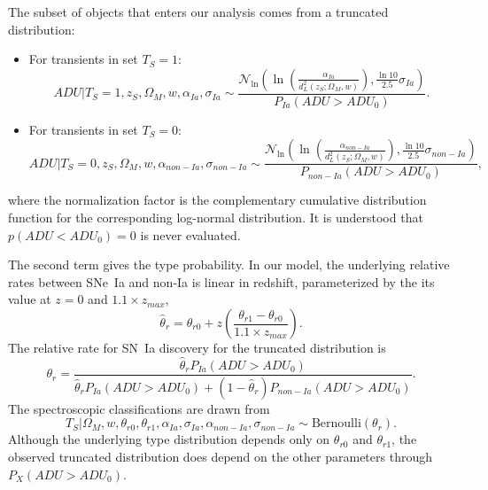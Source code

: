 \documentclass[preprint]{elsarticle}
\begin{document}
The subset of objects that enters our analysis comes from a truncated distribution:
\begin{itemize}
\item For transients in set $T_S=1$:
\begin{equation}
\mathit{ADU} | T_S=1, z_S, \Omega_M, w, \alpha_{Ia},\sigma_{Ia} \sim
\frac{\mathcal{N}_{\ln}\left(\ln{\left(\frac{\alpha_{Ia}}{d_L^2(z_S;\Omega_M, w)}\right)}, \frac{\ln{10}}{2.5}\sigma_{Ia}\right)}{P_{Ia}(\mathit{ADU} > \mathit{ADU}_0)}.
\label{adusnIa:eqn}
\end{equation}
\item For transients in set $T_S=0$:
\begin{equation}
\mathit{ADU} | T_S=0, z_S, \Omega_M, w, \alpha_{\mathit{non-Ia}},\sigma_{\mathit{non-Ia}}\sim 
\frac{\mathcal{N}_{\ln}\left(\ln{\left(\frac{\alpha_{\mathit{non-Ia}}}{d_L^2(z_S;\Omega_M, w)}\right)}, \frac{\ln{10}}{2.5}\sigma_{\mathit{non-Ia}}\right)}{P_{non-Ia}(\mathit{ADU} > \mathit{ADU}_0)},
\label{adunonIa:eqn}
\end{equation}
\end{itemize}
where the normalization factor is the complementary cumulative distribution function
for the corresponding log-normal distribution.
It is understood that $p(\mathit{ADU}<\mathit{ADU}_0)=0$ is never evaluated.

The second term gives the type probability. In our model,
the underlying relative rates between SNe~Ia and non-Ia is linear in redshift,
 parameterized by the
its value at $z=0$ and $1.1 \times z_{max}$, 
\begin{equation}
\hat{\theta}_{r}=\theta_{r0}+z\left(\frac{\theta_{r1}-\theta_{r0}}{1.1 \times z_{max}}\right).
\end{equation}
The relative rate for SN~Ia discovery for the truncated distribution is
\begin{equation}
\theta_{r}=\frac{\hat{\theta}_{r}P_{Ia}(\mathit{ADU} > \mathit{ADU}_0)}{\hat{\theta}_{r}P_{Ia}(\mathit{ADU} > \mathit{ADU}_0) + (1-\hat{\theta}_{r})P_{non-Ia}(\mathit{ADU} > \mathit{ADU}_0)}.
\end{equation}
The spectroscopic classifications are drawn from
\begin{equation}
T_S | \Omega_M, w, \theta_{r0}, \theta_{r1} , \alpha_{Ia},\sigma_{Ia}, \alpha_{\mathit{non-Ia}},\sigma_{\mathit{non-Ia}} \sim \text{Bernoulli}(\theta_r).
\end{equation}
Although the underlying type distribution depends only on $ \theta_{r0}$ and $ \theta_{r1}$,  
the observed truncated distribution does depend on the other parameters through 
$P_{X}(\mathit{ADU} > \mathit{ADU}_0)$.
\end{document}
